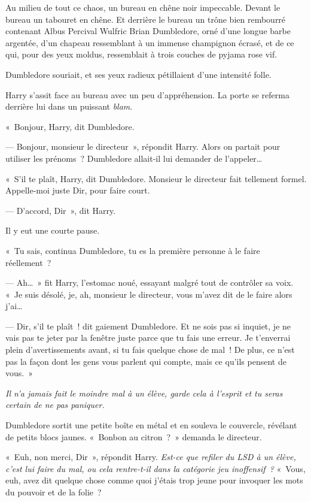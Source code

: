 Au milieu de tout ce chaos, un bureau en chêne noir impeccable.
Devant le bureau un tabouret en chêne.
Et derrière le bureau un trône bien rembourré contenant Albus Percival Wulfric Brian Dumbledore, orné d'une longue barbe argentée, d'un chapeau ressemblant à un immense champignon écrasé, et de ce qui, pour des yeux moldus, ressemblait à trois couches de pyjama rose vif.

Dumbledore souriait, et ses yeux radieux pétillaient d'une intensité folle.

Harry s'assit face au bureau avec un peu d'appréhension.
La porte se referma derrière lui dans un puissant \emph{blam}.

«~Bonjour, Harry, dit Dumbledore.

--- Bonjour, monsieur le directeur~», répondit Harry.
Alors on partait pour utiliser les prénoms~?
Dumbledore allait-il lui demander de l'appeler…

«~S'il te plaît, Harry, dit Dumbledore.
Monsieur le directeur fait tellement formel.
Appelle-moi juste Dir, pour faire court.

--- D'accord, Dir~», dit Harry.

Il y eut une courte pause.

«~Tu sais, continua Dumbledore, tu es la première personne à le faire réellement~?

--- Ah…~» fit Harry, l'estomac noué, essayant malgré tout de contrôler sa voix.
«~Je suis désolé, je, ah, monsieur le directeur, vous m'avez dit de le faire alors j'ai…

--- Dir, s'il te plaît~! dit gaiement Dumbledore.
Et ne sois pas si inquiet, je ne vais pas te jeter par la fenêtre juste parce que tu fais une erreur.
Je t'enverrai plein d'avertissements avant, si tu fais quelque chose de mal~!
De plus, ce n'est pas la façon dont les gens vous parlent qui compte, mais ce qu'ils pensent de vous.~»

\emph{Il n'a jamais fait le moindre mal à un élève, garde cela à l'esprit et tu seras certain de ne pas paniquer.}

Dumbledore sortit une petite boîte en métal et en souleva le couvercle, révélant de petits blocs jaunes.
«~Bonbon au citron~?~»
demanda le directeur.

«~Euh, non merci, Dir~», répondit Harry.
\emph{Est-ce que refiler du LSD à un élève, c'est lui faire du mal, ou cela rentre-t-il dans la catégorie jeu inoffensif~?}
«~Vous, euh, avez dit quelque chose comme quoi j'étais trop jeune pour invoquer les mots du pouvoir et de la folie~?

